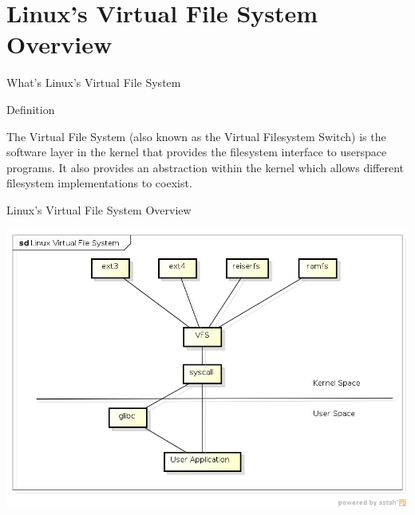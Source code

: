 \documentclass{beamer}
\begin{document}
\section{Linux's Virtual File System Overview}

\begin{frame}{What's Linux's Virtual File System}

  \begin{block}{Definition}

	The Virtual File System (also known as the Virtual Filesystem Switch)
	is the software layer in the kernel that provides the filesystem
	interface to userspace programs. It also provides an abstraction
	within the kernel which allows different filesystem implementations to
	coexist. \footnotemark

  \end{block}


\end{frame}

\begin{frame}{Linux's Virtual File System Overview}

	\includegraphics[scale=0.5]{img/vfs_overview.png}

\end{frame}
\end{document}
